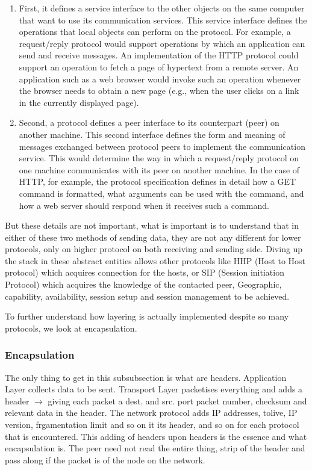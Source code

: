 \documentclass[11pt, a4paper]{article}
\begin{document}
\begin{enumerate}
    \item First, it defines a service interface to the other objects on the same computer that want to use its communication services. This service interface defines the operations that local objects can perform on the protocol. For example, a request/reply protocol would support operations by which an application can send and receive messages. An implementation of the HTTP protocol could support an operation to fetch a page of hypertext from a remote server. An application such as a web browser would invoke such an operation whenever the browser needs to obtain a new page (e.g., when the user clicks on a link in the currently displayed page).
    \item Second, a protocol defines a peer interface to its counterpart (peer) on another machine. This second interface defines the form and meaning of messages exchanged between protocol peers to implement the communication service. This would determine the way in which a request/reply protocol on one machine communicates with its peer on another machine. In the case of HTTP, for example, the protocol specification defines in detail how a GET command is formatted, what arguments can be used with the command, and how a web server should respond when it receives such a command.
\end{enumerate}

But these details are not important, what is important is to understand that in either of these two methods of sending data, they are not any different for lower protocols, only on higher protocol on both receiving and sending side. Diving up the stack in these abstract entities allows other protocols like HHP (Host to Host protocol) which acquires connection for the hosts, or SIP (Session initiation Protocol) which acquires the knowledge of the contacted peer, Geographic, capability, availability, session setup and session management to be achieved.

To further understand how layering is actually implemented despite so many protocols, we look at encapsulation.

\subsubsection{Encapsulation}
The only thing to get in this subsubsection is what are headers. Application Layer collects data to be sent. Transport Layer packetises everything and adds a header $\to$ giving each packet a dest. and src. port packet number, checksum and relevant data in the header. The network protocol adds IP addresses, tolive, IP version, frgamentation limit and so on it its header, and so on for each protocol that is encountered. This adding of headers upon headers is the essence and what encapsulation is. The peer need not read the entire thing, strip of the header and pass along if the packet is of the node on the network.
\end{document}
